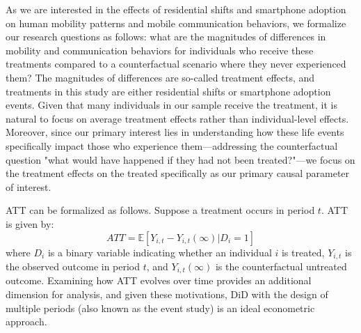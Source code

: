 
As we are interested in the effects of residential shifts and smartphone adoption on human mobility patterns and mobile communication behaviors, we formalize our research questions as follows: what are the magnitudes of differences in mobility and communication behaviors for individuals who receive these treatments compared to a counterfactual scenario where they never experienced them?
The magnitudes of differences are so-called treatment effects, and treatments in this study are either residential shifts or smartphone adoption events. Given that many individuals in our sample receive the treatment, it is natural to focus on average treatment effects rather than individual-level effects.
Moreover, since our primary interest lies in understanding how these life events specifically impact those who experience them---addressing the counterfactual question "what would have happened if they had not been treated?"---we focus on the treatment effects on the treated specifically as our primary causal parameter of interest.

\clearpage\newpage
ATT can be formalized as follows. Suppose a treatment occurs in period $t$. ATT is given by:
\[
ATT = \mathbb{E}[Y_{i, t} - Y_{i, t}(\infty) | D_i = 1]
\]
where \( D_i \) is a binary variable indicating whether an individual \( i \) is treated, $Y_{i, t}$ is the observed outcome in period $t$, and $Y_{i, t}(\infty)$ is the counterfactual untreated outcome. Examining how ATT evolves over time provides an additional dimension for analysis, and given these motivations, DiD with the design of multiple periods (also known as the event study) is an ideal econometric approach.


